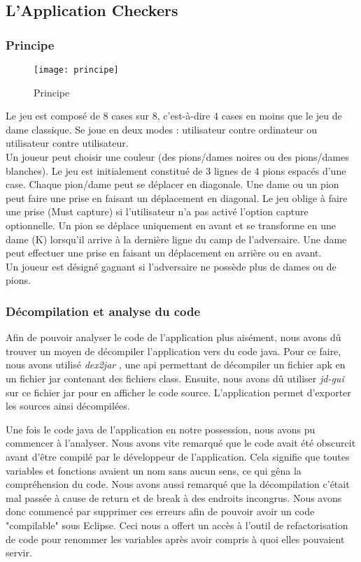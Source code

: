 \newpage
\subsection{L'Application Checkers}

\subsubsection{Principe}
\begin{figure}[hp]
	      \begin{center}
			\texttt{[image: principe]}
	      \end{center}
	\caption{Principe}
\end{figure}

Le jeu est composé de 8 cases sur 8, c’est-à-dire 4 cases en moins que le jeu de dame classique.  Se joue en deux modes : utilisateur contre ordinateur ou utilisateur contre utilisateur.\\
Un joueur peut choisir une couleur (des pions/dames noires ou des pions/dames blanches).  Le jeu est initialement constitué de 3 lignes de 4 pions espacés d’une case. Chaque \hbox{pion/dame} peut se déplacer en diagonale. 
Une dame ou un pion peut faire une prise en faisant un déplacement en diagonal. Le jeu oblige à faire une prise (Must capture) si l'utilisateur n'a pas activé l'option capture optionnelle. 
Un pion se déplace uniquement en avant et se transforme en une dame (K) lorsqu’il arrive à la dernière ligne du camp de l’adversaire. Une dame peut effectuer une prise en faisant un déplacement en arrière ou en avant.\\
Un joueur est désigné gagnant si l’adversaire ne possède plus de dames ou de pions.

\subsubsection{Décompilation et analyse du code}

Afin de pouvoir analyser le code de l'application plus aisément, nous avons dû trouver un moyen de décompiler l'application vers du code java.
Pour ce faire, nous avons utilisé \textit{dex2jar} \cite{dex2jar},
une api permettant de décompiler un fichier apk en un fichier jar contenant des fichiers class.
Ensuite, nous avons dû utiliser \textit{jd-gui} \cite{jdgui} sur ce fichier jar pour en afficher le code source.
L'application permet d'exporter les sources ainsi décompilées.

Une fois le code java de l'application en notre possession, nous avons pu commencer à l'analyser.
Nous avons vite remarqué que le code avait été obscurcit avant d'être compilé par le développeur de l'application.
Cela signifie que toutes variables et fonctions avaient un nom sans aucun sens, ce qui gêna la compréhension du code.
Nous avons aussi remarqué que la décompilation c'était mal passée à cause de return et de break à des endroits incongrus.
Nous avons donc commencé par supprimer ces erreurs afin de pouvoir avoir un code "compilable" sous Eclipse.
Ceci nous a offert un accès à l'outil de refactorisation de code pour renommer les variables après avoir compris à quoi elles pouvaient servir.

